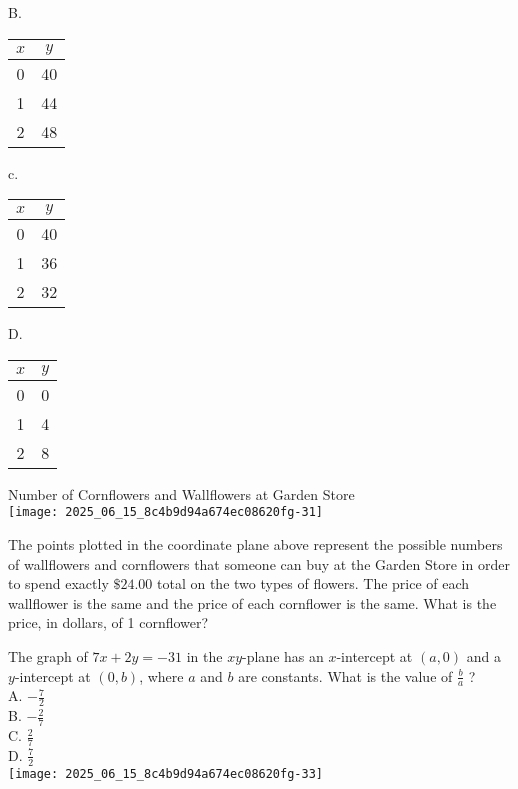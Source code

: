 B.

\begin{center}
\begin{tabular}{|c|c|}
\hline
$x$ & $y$ \\
\hline
0 & 40 \\
\hline
1 & 44 \\
\hline
2 & 48 \\
\hline
\end{tabular}
\end{center}

c.

\begin{center}
\begin{tabular}{|c|c|}
\hline
$x$ & $y$ \\
\hline
0 & 40 \\
\hline
1 & 36 \\
\hline
2 & 32 \\
\hline
\end{tabular}
\end{center}

D.

\begin{center}
\begin{tabular}{|c|c|}
\hline
$x$ & $y$ \\
\hline
0 & 0 \\
\hline
1 & 4 \\
\hline
2 & 8 \\
\hline
\end{tabular}
\end{center}

Number of Cornflowers and Wallflowers at Garden Store\\
\texttt{[image: 2025\_06\_15\_8c4b9d94a674ec08620fg-31]}

The points plotted in the coordinate plane above represent the possible numbers of wallflowers and cornflowers that someone can buy at the Garden Store in order to spend exactly $\$ 24.00$ total on the two types of flowers. The price of each wallflower is the same and the price of each cornflower is the same. What is the price, in dollars, of 1 cornflower?

The graph of $7 x+2 y=-31$ in the $x y$-plane has an $x$-intercept at $(a, 0)$ and a $y$-intercept at $(0, b)$, where $a$ and $b$ are constants. What is the value of $\frac{b}{a}$ ?\\
A. $-\frac{7}{2}$\\
B. $-\frac{2}{7}$\\
C. $\frac{2}{7}$\\
D. $\frac{7}{2}$\\
\texttt{[image: 2025\_06\_15\_8c4b9d94a674ec08620fg-33]}

